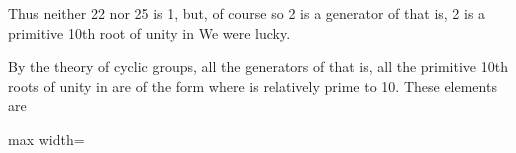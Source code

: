 \documentclass[11pt,oneside]{article}
\begin{document}
\begin{BookBody}
\noindent Thus neither 22 nor 25 is 1, but, of course so 2 is a generator of  that is, 2 is a primitive 10th root of unity in  We were lucky.

By the theory of cyclic groups, all the generators of  that is, all the primitive 10th roots of unity in  are of the form  where  is relatively prime to 10. These elements are

\begin{center}\begin{adjustbox}{max width=\linewidth}\end{adjustbox}\end{center}

\end{BookBody}

\BookNarrativetrue
\end{document}
